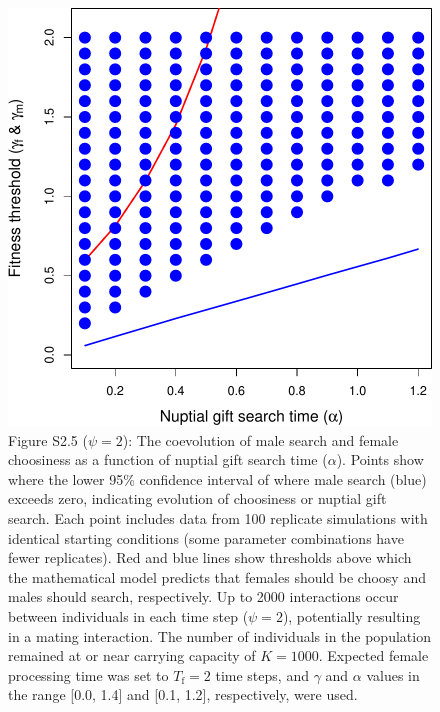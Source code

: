 \documentclass[
]{article}
\begin{document}
\captionsetup{labelformat=default}

\clearpage

\captionsetup{labelformat=empty}

\begin{figure}
\centering
\includegraphics{ms_biorxiv_files/figure-latex/unnamed-chunk-10-1.pdf}
\caption{Figure S2.5 (\(\psi = 2\)): The coevolution of male search and
female choosiness as a function of nuptial gift search time
(\(\alpha\)). Points show where the lower 95\% confidence interval of
where male search (blue) exceeds zero, indicating evolution of
choosiness or nuptial gift search. Each point includes data from 100
replicate simulations with identical starting conditions (some parameter
combinations have fewer replicates). Red and blue lines show thresholds
above which the mathematical model predicts that females should be
choosy and males should search, respectively. Up to 2000 interactions
occur between individuals in each time step (\(\psi = 2\)), potentially
resulting in a mating interaction. The number of individuals in the
population remained at or near carrying capacity of \(K = 1000\).
Expected female processing time was set to \(T_{\mathrm{f}}=2\) time
steps, and \(\gamma\) and \(\alpha\) values in the range {[}0.0, 1.4{]}
and {[}0.1, 1.2{]}, respectively, were used.}
\end{figure}
\end{document}
